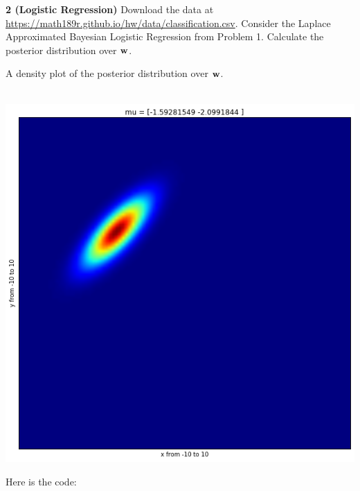 \documentclass[12pt,letterpaper,fleqn]{hmcpset}
\begin{document}
\newpage

\textbf{2 (Logistic Regression)} Download the data at
\url{https://math189r.github.io/hw/data/classification.csv}. Consider the Laplace Approximated
Bayesian Logistic Regression from Problem 1. Calculate the posterior distribution
over ${\bf w}$.

\begin{solution}
	A density plot of the posterior distribution over ${\bf w}$.\\\\
	\begin{center}
		\includegraphics[scale = .5]{posterior.png}
	\end{center}
	
	Here is the code:
	

\end{solution}

\newpage
\end{document}
